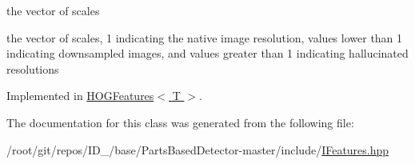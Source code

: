 the vector of scales 

the vector of scales, 1 indicating the native image resolution, values lower than 1 indicating downsampled images, and values greater than 1 indicating hallucinated resolutions 

\-Implemented in \hyperlink{classHOGFeatures_ad9668fda860881c676e1d1bd70adc18c}{\-H\-O\-G\-Features$<$ T $>$}.



\-The documentation for this class was generated from the following file\-:\begin{DoxyCompactItemize}
\item 
/root/git/repos/\-I\-D\-\_/base/\-Parts\-Based\-Detector-\/master/include/\hyperlink{IFeatures_8hpp}{\-I\-Features.\-hpp}\end{DoxyCompactItemize}
